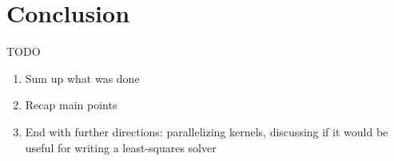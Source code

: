 \documentclass[12pt]{article}
\begin{document}
\section*{Conclusion}
\par\null\par
TODO
\begin{enumerate}
    \item Sum up what was done
    \item Recap main points
    \item End with further directions: parallelizing kernels, discussing if it would
        be useful for writing a least-squares solver
\end{enumerate}



\end{document}
